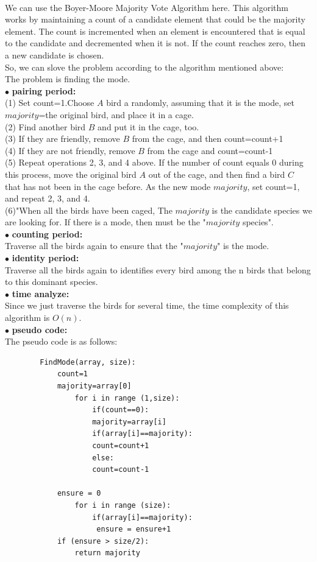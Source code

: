\documentclass[12pt,a4paper]{article}
\newcommand{\question}[1]{\bigskip\noindent{\textbf{Q{#1} solution}}}
\begin{document}
\question{15.A}
\\We can use the Boyer-Moore Majority Vote Algorithm here. This algorithm works by maintaining a count of a candidate element that could be the majority element.
The count is incremented when an element is encountered that is equal to the candidate and decremented when it is not. If the count reaches zero, then a new candidate is chosen.
\\So, we can slove the problem according to the algorithm mentioned above:
\\The problem is finding the mode.
\\$\bullet$ \textbf{pairing period:}
\\(1) Set count=1.Choose $A$ bird a randomly, assuming that it is the mode, set $majority$=the original bird, and place it in a cage.
\\(2) Find another bird $B$ and put it in the cage, too.
\\(3) If they are friendly, remove $B$ from the cage, and then count=count+1
\\(4) If they are not friendly, remove $B$ from the cage and count=count-1
\\(5) Repeat operations 2, 3, and 4 above. If the number of count equals 0 during this process, move the original bird $A$ out of the cage, and then find a bird $C$ that has not been in the cage before. As the new mode $majority$, set count=1, and repeat 2, 3, and 4.
\\(6)"When all the birds have been caged, The $majority$ is the candidate species we are looking for. If there is a mode, then must be the "$majority$ species".
\\$\bullet$ \textbf{counting period:}
\\Traverse all the birds again to ensure that the "$majority$" is the mode.
\\$\bullet$ \textbf{identity period:}
\\Traverse all the birds again to  identifies every bird among the n birds that belong to this dominant species.
\\$\bullet$ \textbf{time analyze:}
\\ Since we just traverse the birds for several time, the time complexity of this algorithm is $O(n)$.
\\$\bullet$ \textbf{pseudo code:}
\\The pseudo code is as follows:
	\begin{lstlisting}
		FindMode(array, size):
	  		count=1
       	 	majority=array[0]
        		for i in range (1,size):
		            if(count==0): 
					majority=array[i]
		            if(array[i]==majority): 
					count=count+1
		            else: 
					count=count-1
			
			ensure = 0
        		for i in range (size):
		            if(array[i]==majority):
					 ensure = ensure+1
	  		if (ensure > size/2):
				return majority
	\end{lstlisting}
\end{document}
